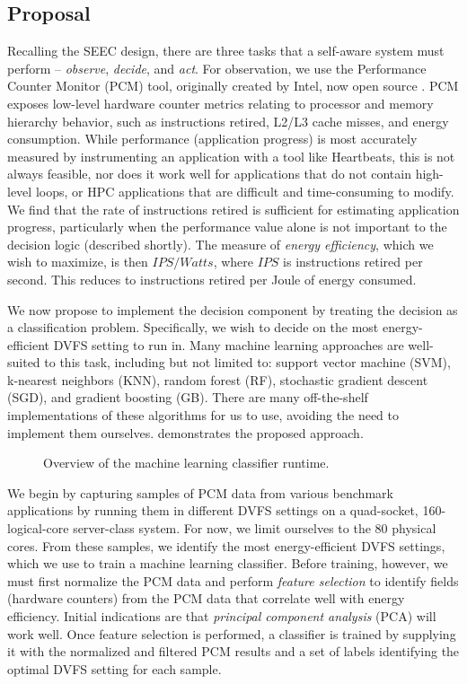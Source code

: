 \subsection{Proposal}

Recalling the SEEC design, there are three tasks that a self-aware system must perform -- \emph{observe}, \emph{decide}, and \emph{act}.
For observation, we use the Performance Counter Monitor (PCM) tool, originally created by Intel, now open source \cite{PCMGit}.
PCM exposes low-level hardware counter metrics relating to processor and memory hierarchy behavior, such as instructions retired, L2/L3 cache misses, and energy consumption.
While performance (\ie application progress) is most accurately measured by instrumenting an application with a tool like Heartbeats, this is not always feasible, nor does it work well for applications that do not contain high-level loops, or HPC applications that are difficult and time-consuming to modify.
We find that the rate of instructions retired is sufficient for estimating application progress, particularly when the performance value alone is not important to the decision logic (described shortly).
The measure of \emph{energy efficiency}, which we wish to maximize, is then $IPS / Watts$, where $IPS$ is instructions retired per second.
This reduces to instructions retired per Joule of energy consumed.

We now propose to implement the decision component by treating the decision as a classification problem.
Specifically, we wish to decide on the most energy-efficient DVFS setting to run in.
Many machine learning approaches are well-suited to this task, including but not limited to: support vector machine (SVM), k-nearest neighbors (KNN), random forest (RF), stochastic gradient descent (SGD), and gradient boosting (GB).
There are many off-the-shelf implementations of these algorithms for us to use, avoiding the need to implement them ourselves.
 demonstrates the proposed approach.

\begin{figure}[t]
  \begin{centering}
    
    \caption{Overview of the machine learning classifier runtime.}
    \label{fig:classifier-runtime}
  \end{centering}
\end{figure}

We begin by capturing samples of PCM data from various benchmark applications by running them in different DVFS settings on a quad-socket, 160-logical-core server-class system.
For now, we limit ourselves to the 80 physical cores.
From these samples, we identify the most energy-efficient DVFS settings, which we use to train a machine learning classifier.
Before training, however, we must first normalize the PCM data and perform \emph{feature selection} to identify fields (hardware counters) from the PCM data that correlate well with energy efficiency.
Initial indications are that \emph{principal component analysis} (PCA) will work well.
Once feature selection is performed, a classifier is trained by supplying it with the normalized and filtered PCM results and a set of labels identifying the optimal DVFS setting for each sample.

